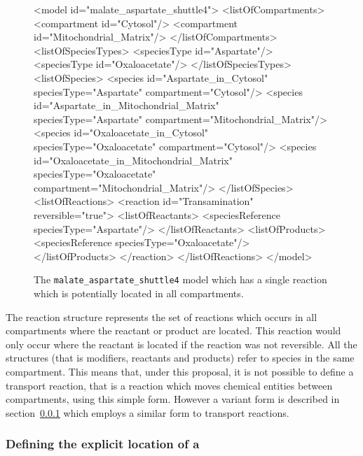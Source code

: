 \documentclass{cekarticle}
\begin{document}
\begin{figure}[h]
\begin{example}
<model id="malate_aspartate_shuttle4">
    <listOfCompartments>
        <compartment id="Cytosol"/>
        <compartment id="Mitochondrial_Matrix"/>
    </listOfCompartments>
    <listOfSpeciesTypes>
        <speciesType id="Aspartate"/>
        <speciesType id="Oxaloacetate"/>
    </listOfSpeciesTypes>
    <listOfSpecies>
        <species
            id="Aspartate_in_Cytosol"
            speciesType="Aspartate"
            compartment="Cytosol"/>
        <species
            id="Aspartate_in_Mitochondrial_Matrix"
            speciesType="Aspartate"
            compartment="Mitochondrial_Matrix"/>
        <species
            id="Oxaloacetate_in_Cytosol"
            speciesType="Oxaloacetate"
            compartment="Cytosol"/>
        <species
            id="Oxaloacetate_in_Mitochondrial_Matrix"
            speciesType="Oxaloacetate"
            compartment="Mitochondrial_Matrix"/>
    </listOfSpecies>
    <listOfReactions>
        <reaction id="Transamination" reversible="true">
            <listOfReactants>
                <speciesReference speciesType="Aspartate"/>
            </listOfReactants>
            <listOfProducts>
                <speciesReference speciesType="Oxaloacetate"/>
            </listOfProducts>
        </reaction>
    </listOfReactions>
</model>
\end{example}
\caption{The \texttt{malate\_aspartate\_shuttle4} model which has a single reaction which is potentially
located in all compartments.}
\label{fig:malate_aspartate_shuttle4-xml}
\end{figure}

The reaction structure represents the set of reactions which occurs in all compartments where
the reactant or product are located.  This reaction would only occur where the reactant is located
if the reaction was not reversible.  All the  structures (that is
modifiers, reactants and products) refer to
species in the same compartment.  This means that, under this proposal, it is not possible to define
a transport reaction, that is a reaction which moves chemical entities between compartments,
using this simple form.  However a variant form is described in
section~\ref{sec:locatedspeciesreferences} which employs a similar form to transport reactions.

\subsubsection{Defining the explicit location of a }
\label{sec:locatedspeciesreferences}
\end{document}
